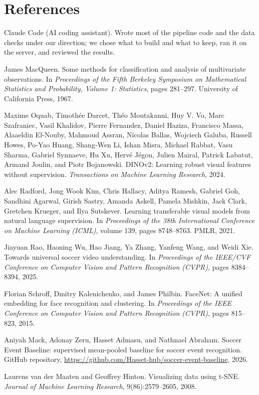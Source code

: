 \documentclass[11pt]{article}
\begin{document}
\section*{References}
\begin{enumerate}[label={[\arabic*]}, noitemsep]
  \item Claude Code (AI coding assistant). Wrote most of the pipeline code and the data checks under our
        direction; we chose what to build and what to keep, ran it on the server, and reviewed the results.
  \item James MacQueen. Some methods for classification and analysis of multivariate observations. In
        \emph{Proceedings of the Fifth Berkeley Symposium on Mathematical Statistics and Probability, Volume 1:
        Statistics}, pages 281--297. University of California Press, 1967.
  \item Maxime Oquab, Timoth\'ee Darcet, Th\'eo Moutakanni, Huy V. Vo, Marc Szafraniec, Vasil Khalidov, Pierre
        Fernandez, Daniel Haziza, Francisco Massa, Alaaeldin El-Nouby, Mahmoud Assran, Nicolas Ballas, Wojciech
        Galuba, Russell Howes, Po-Yao Huang, Shang-Wen Li, Ishan Misra, Michael Rabbat, Vasu Sharma, Gabriel
        Synnaeve, Hu Xu, Herv\'e J\'egou, Julien Mairal, Patrick Labatut, Armand Joulin, and Piotr Bojanowski.
        DINOv2: Learning robust visual features without supervision. \emph{Transactions on Machine Learning
        Research}, 2024.
  \item Alec Radford, Jong Wook Kim, Chris Hallacy, Aditya Ramesh, Gabriel Goh, Sandhini Agarwal, Girish Sastry,
        Amanda Askell, Pamela Mishkin, Jack Clark, Gretchen Krueger, and Ilya Sutskever. Learning transferable
        visual models from natural language supervision. In \emph{Proceedings of the 38th International
        Conference on Machine Learning (ICML)}, volume 139, pages 8748--8763. PMLR, 2021.
  \item Jiayuan Rao, Haoning Wu, Hao Jiang, Ya Zhang, Yanfeng Wang, and Weidi Xie. Towards universal soccer
        video understanding. In \emph{Proceedings of the IEEE/CVF Conference on Computer Vision and Pattern
        Recognition (CVPR)}, pages 8384--8394, 2025.
  \item Florian Schroff, Dmitry Kalenichenko, and James Philbin. FaceNet: A unified embedding for face
        recognition and clustering. In \emph{Proceedings of the IEEE Conference on Computer Vision and Pattern
        Recognition (CVPR)}, pages 815--823, 2015.
  \item Aniyah Mack, Adonay Zeru, Hasset Admasu, and Nathnael Abraham. Soccer Event Baseline: supervised
        mean-pooled baseline for soccer event recognition. GitHub repository,
        \url{https://github.com/Hasset-hub/soccer-event-baseline}, 2026.
  \item Laurens van der Maaten and Geoffrey Hinton. Visualizing data using t-SNE. \emph{Journal of Machine
        Learning Research}, 9(86):2579--2605, 2008.
\end{enumerate}
\end{document}
